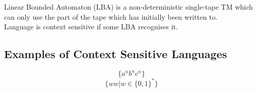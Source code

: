 Linear Bounded Automaton (LBA) is a non-deterministic single-tape TM which can only use the part of the tape which has initially been written to.\\
Language is context sensitive if some LBA recognises it.

\subsection{Examples of Context Sensitive Languages}
$$\{a^nb^nc^n\}$$
$$\{ww|w\in \{0,1\}^*\}$$
